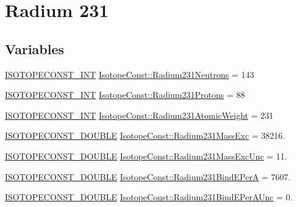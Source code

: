 \hypertarget{group___isotope_const-_radium-_ra231}{}\section{Radium 231}
\label{group___isotope_const-_radium-_ra231}
\subsection*{Variables}
\begin{DoxyCompactItemize}
\item 
\mbox{\hyperlink{group___isotope_const-_macros_ga5f18360b3e99483a35c32d789e62621c}{I\+S\+O\+T\+O\+P\+E\+C\+O\+N\+S\+T\+\_\+\+I\+NT}} \mbox{\hyperlink{group___isotope_const-_radium-_ra231_ga6139436b24b223ab5df8e7bbd973439a}{Isotope\+Const\+::\+Radium231\+Neutrons}} = 143
\item 
\mbox{\hyperlink{group___isotope_const-_macros_ga5f18360b3e99483a35c32d789e62621c}{I\+S\+O\+T\+O\+P\+E\+C\+O\+N\+S\+T\+\_\+\+I\+NT}} \mbox{\hyperlink{group___isotope_const-_radium-_ra231_ga165d958ca07169ff2d864dfb4d06d26e}{Isotope\+Const\+::\+Radium231\+Protons}} = 88
\item 
\mbox{\hyperlink{group___isotope_const-_macros_ga5f18360b3e99483a35c32d789e62621c}{I\+S\+O\+T\+O\+P\+E\+C\+O\+N\+S\+T\+\_\+\+I\+NT}} \mbox{\hyperlink{group___isotope_const-_radium-_ra231_ga9afd4dce3e351ad7b33482999f1a4963}{Isotope\+Const\+::\+Radium231\+Atomic\+Weight}} = 231
\item 
\mbox{\hyperlink{group___isotope_const-_macros_ga8f45a7272ce02c0b4c65c44636ed719a}{I\+S\+O\+T\+O\+P\+E\+C\+O\+N\+S\+T\+\_\+\+D\+O\+U\+B\+LE}} \mbox{\hyperlink{group___isotope_const-_radium-_ra231_ga8d3a6b69b1f1dfff138e9bf44949160e}{Isotope\+Const\+::\+Radium231\+Mass\+Exc}} = 38216.
\item 
\mbox{\hyperlink{group___isotope_const-_macros_ga8f45a7272ce02c0b4c65c44636ed719a}{I\+S\+O\+T\+O\+P\+E\+C\+O\+N\+S\+T\+\_\+\+D\+O\+U\+B\+LE}} \mbox{\hyperlink{group___isotope_const-_radium-_ra231_ga308f890683247c512c05dbcb0aacba88}{Isotope\+Const\+::\+Radium231\+Mass\+Exc\+Unc}} = 11.
\item 
\mbox{\hyperlink{group___isotope_const-_macros_ga8f45a7272ce02c0b4c65c44636ed719a}{I\+S\+O\+T\+O\+P\+E\+C\+O\+N\+S\+T\+\_\+\+D\+O\+U\+B\+LE}} \mbox{\hyperlink{group___isotope_const-_radium-_ra231_ga284cdcb1afc30ff52983f2310fa7c6c4}{Isotope\+Const\+::\+Radium231\+Bind\+E\+PerA}} = 7607.
\item 
\mbox{\hyperlink{group___isotope_const-_macros_ga8f45a7272ce02c0b4c65c44636ed719a}{I\+S\+O\+T\+O\+P\+E\+C\+O\+N\+S\+T\+\_\+\+D\+O\+U\+B\+LE}} \mbox{\hyperlink{group___isotope_const-_radium-_ra231_gaa9e1d1b3c456828a222b9964e215cb31}{Isotope\+Const\+::\+Radium231\+Bind\+E\+Per\+A\+Unc}} = 0.

\end{DoxyCompactItemize}
